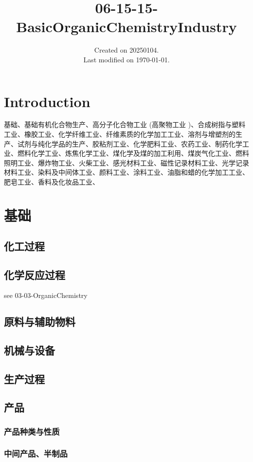 \documentclass[UTF8]{../../ApplicationUniverse}
\begin{document}
\title{06-15-15-BasicOrganicChemistryIndustry}
\date{Created on 20250104.\\   Last modified on \today.}
\maketitle
\tableofcontents


\chapter{Introduction}

基础、基础有机化合物生产、高分子化合物工业 (高聚物工业 )、合成树指与塑料工业、橡胶工业、化学纤维工业、纤维素质的化学加工工业、溶剂与增塑剂的生产、试剂与纯化学品的生产、胶粘剂工业、化学肥料工业、农药工业、制药化学工业、燃料化学工业、炼焦化学工业、煤化学及煤的加工利用、煤炭气化工业、燃料照明工业、爆炸物工业、火柴工业、感光材料工业、磁性记录材料工业、光学记录材料工业、染料及中间体工业、颜料工业、涂料工业、油脂和蜡的化学加工工业、肥皂工业、香料及化妆品工业、

\chapter{基础}
\section{化工过程}
\section{化学反应过程} %
see 03-03-OrganicChemistry
\section{原料与辅助物料}
\section{机械与设备}
\section{生产过程}
\section{产品}
    \subsection{产品种类与性质}
    \subsection{中间产品、半制品}
\end{document}
